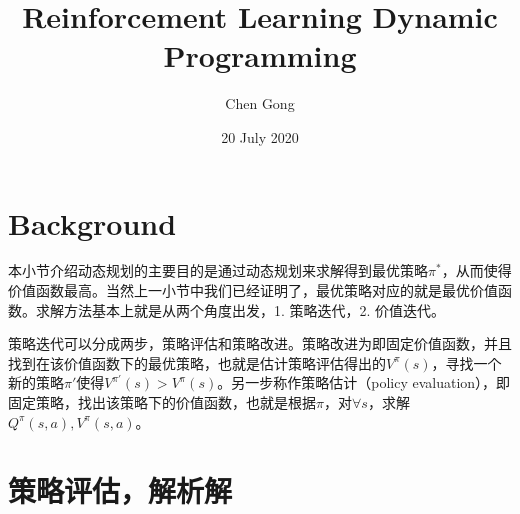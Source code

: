 \documentclass[a4paper]{article}
\title{Reinforcement Learning Dynamic Programming}
\author{Chen Gong}
\date{20 July 2020}
\begin{document}

\maketitle
\tableofcontents
\newpage
\setcounter{page}{1} %
\section{Background}
本小节介绍动态规划的主要目的是通过动态规划来求解得到最优策略$\pi^\ast$，从而使得价值函数最高。当然上一小节中我们已经证明了，最优策略对应的就是最优价值函数。求解方法基本上就是从两个角度出发，1. 策略迭代，2. 价值迭代。

策略迭代可以分成两步，策略评估和策略改进。策略改进为即固定价值函数，并且找到在该价值函数下的最优策略，也就是估计策略评估得出的$V^\pi(s)$，寻找一个新的策略$\pi'$使得$V^{\pi'}(s) > V^{\pi}(s)$。另一步称作策略估计（policy evaluation），即固定策略，找出该策略下的价值函数，也就是根据$\pi$，对$\forall s$，求解$Q^\pi(s,a),V^\pi(s,a)$。

\section{策略评估，解析解}
\end{document}
